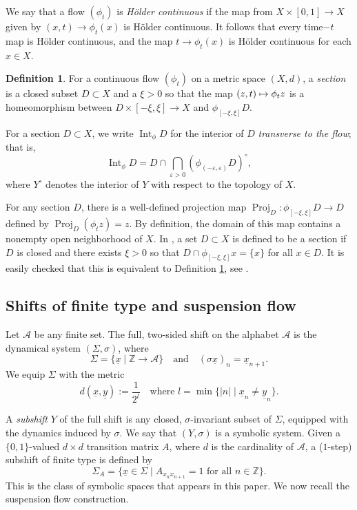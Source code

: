 \documentclass[10pt]{amsart}
\let\mathcal\mathscr
\let\epsilon\varepsilon
\let\sep\mid
\def\mto{\mathchoice{\longmapsto}{\mapsto}{\mapsto}{\mapsto}}
\theoremstyle{definition}
\newtheorem{defn}[thm]{Definition}
\numberwithin{equation}{section}
\DeclareMathOperator{\Int}{Int}
\DeclareMathOperator{\Proj}{Proj}
\begin{document}
We say that a flow $(\phi_t)$ is \emph{Hölder continuous} if the map from $X \times [0,1] \to X$ given by $(x,t) \to \phi_t(x)$ is Hölder continuous. It follows that every time$-t$ map is Hölder continuous, and the map $t \to \phi_t(x)$ is Hölder continuous for each $x\in X$.

\begin{defn}\label{defn:section}
For a continuous flow $( \phi_t )$ on a metric space $(X,d)$, a \emph{section} is a closed subset $D\subset X$ and a $\xi>0$ so that the map $(z,t) \mto \phi_tz$ is a homeomorphism between $D \times [-\xi, \xi] \to X$ and $\phi_{[-\xi,\xi]}D$.
\end{defn}

For a section $D \subset X$, we write $\Int_\phi D$ for the interior of $D$ \emph{transverse to the flow}; that is,
\[\Int_\phi D = D \cap \bigcap_{\epsilon>0}(\phi_{(-\epsilon,\epsilon)}D)^\circ,\]
where $Y^\circ$ denotes the interior of $Y$ with respect to the topology of $X$.

For any section $D$, there is a well-defined projection map $\Proj_D: \phi_{[-\xi,\xi]}D \to D$ defined by $\Proj_D(\phi_tz) =z$. By definition, the domain of this map contains a nonempty open neighborhood of $X$. In \cite{BW}, a set $D \subset X$ is defined to be a section if $D$ is closed and there exists $\xi>0$ so that $D \cap \phi_{[-\xi,\xi]}x = \{x\}$ for all $x \in D$. It is easily checked that this is equivalent to Definition \ref{defn:section}, see \cite[\S 5]{BW}.

\subsection{Shifts of finite type and suspension flow}

Let $\mathcal{A}$ be any finite set. The full, two-sided shift on the alphabet $\mathcal{A}$ is the dynamical system $(\Sigma, \sigma)$, where
\[ \Sigma = \{ \underline x\sep \mathbb{Z} \to \mathcal{A} \} \quad \mbox{and} \quad (\sigma \underline x)_n = \underline x_{n+1}. \]
We equip $\Sigma$ with the metric
\[ d(\underline x, \underline y) := \frac{1}{2^l} \quad \mbox{where } l = \min\{|n|\sep\underline x_n \neq \underline y_n\}. \]

A \emph{subshift} $Y$ of the full shift is any closed, $\sigma$-invariant subset of $\Sigma$, equipped with the dynamics induced by $\sigma$. We say that $(Y, \sigma)$ is a symbolic system. Given a $\{0,1\}$-valued $d \times d $ transition matrix $A$, where $d$ is the cardinality of $\mathcal{A}$, a ($1$-step) subshift of finite type is defined by
\[
\Sigma_A = \{\underline x \in \Sigma \sep A_{x_n x_{n+1}}=1 \mbox{ for all } n\in \mathbb{Z}\}.
\]
This is the class of symbolic spaces that appears in this paper. We now recall the suspension flow construction.
\end{document}
